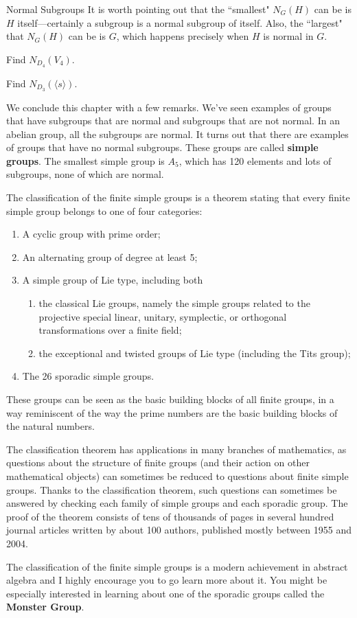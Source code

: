 \begin{section}{Normal Subgroups}
It is worth pointing out that the ``smallest" $N_G(H)$ can be is $H$ itself---certainly a subgroup is a normal subgroup of itself.  Also, the ``largest" that $N_G(H)$ can be is $G$, which happens precisely when $H$ is normal in $G$.

\begin{exercise}
Find $N_{D_4}(V_4)$.
\end{exercise}

\begin{exercise}
Find $N_{D_3}(\langle s\rangle)$.
\end{exercise}

We conclude this chapter with a few remarks.  We've seen examples of groups that have subgroups that are normal and subgroups that are not normal.  In an abelian group, all the subgroups are normal.  It turns out that there are examples of groups that have no normal subgroups.  These groups are called \textbf{simple groups}.  The smallest simple group is $A_5$, which has 120 elements and lots of subgroups, none of which are normal.


The classification of the finite simple groups is a theorem stating that every finite simple group belongs to one of four categories:
\begin{enumerate}
\item A cyclic group with prime order;
\item An alternating group of degree at least 5;
\item A simple group of Lie type, including both 
\begin{enumerate}
\item the classical Lie groups, namely the simple groups related to the projective special linear, unitary, symplectic, or orthogonal transformations over a finite field;
\item the exceptional and twisted groups of Lie type (including the Tits group);
\end{enumerate}
\item The 26 sporadic simple groups.
\end{enumerate}
These groups can be seen as the basic building blocks of all finite groups, in a way reminiscent of the way the prime numbers are the basic building blocks of the natural numbers.

The classification theorem has applications in many branches of mathematics, as questions about the structure of finite groups (and their action on other mathematical objects) can sometimes be reduced to questions about finite simple groups. Thanks to the classification theorem, such questions can sometimes be answered by checking each family of simple groups and each sporadic group.  The proof of the theorem consists of tens of thousands of pages in several hundred journal articles written by about 100 authors, published mostly between 1955 and 2004.

The classification of the finite simple groups is a modern achievement in abstract algebra and I highly encourage you to go learn more about it.  You might be especially interested in learning about one of the sporadic groups called the \textbf{Monster Group}.

\end{section}